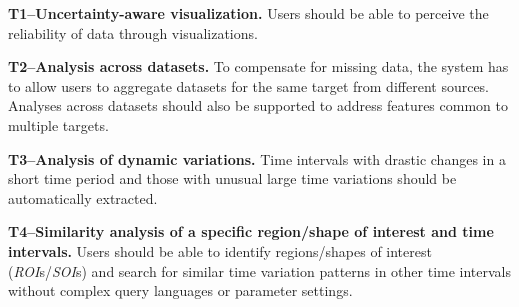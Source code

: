 \noindent\textbf{T1--Uncertainty-aware visualization.} 
Users should be able to perceive the reliability of data through visualizations. 

\noindent\textbf{T2--Analysis across datasets.} 
To compensate for missing data, 
the system has to allow users to aggregate datasets for the same target from different sources.
Analyses across datasets should also be supported to address features common to multiple targets.

\noindent\textbf{T3--Analysis of dynamic variations.} 
Time intervals with drastic changes in a short time period and those with unusual large time variations should be automatically extracted.

\noindent\textbf{T4--Similarity analysis of a specific region/shape of interest and time intervals.} 
Users should be able to identify regions/shapes of interest (\emph{ROI}s/\emph{SOI}s) and search for similar time variation patterns in other time intervals without complex query languages or parameter settings.

